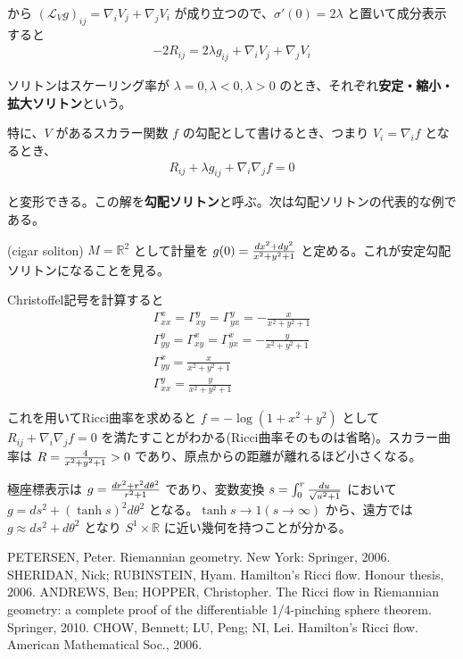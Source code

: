 \documentclass[dvipdfmx,a4paper]{jsreport}
\theoremstyle{definition}
\renewcommand{\L}{\mathcal{L}}
\newcommand{\R}{\mathbb{R}}
\begin{document}
から $(\L_V g)_{ij}=\nabla_i V_j+\nabla_j V_i$ が成り立つので、$\sigma'(0)=2\lambda$ と置いて成分表示すると
\begin{align*}
    -2R_{ij}=2\lambda g_{ij}+\nabla_i V_j+\nabla_j V_i
\end{align*}

ソリトンはスケーリング率が $\lambda=0,\lambda<0,\lambda>0$ のとき、それぞれ\textbf{安定・縮小・拡大ソリトン}という。

特に、$V$ があるスカラー関数 $f$ の勾配として書けるとき、つまり $V_i=\nabla_i f$ となるとき、
\begin{align*}
    R_{ij}+\lambda g_{ij}+\nabla_i \nabla_j f=0
\end{align*}

と変形できる。この解を\textbf{勾配ソリトン}と呼ぶ。次は勾配ソリトンの代表的な例である。

\eg (cigar soliton) $M=\R^2$ として計量を $g(0)={dx^2+dy^2 \over x^2+y^2+1}$ と定める。これが安定勾配ソリトンになることを見る。

Christoffel記号を計算すると
\begin{align*}
    \Gamma^x_{xx} = \Gamma^y_{xy} = \Gamma^y_{{yx}} = - \frac{x}{ x^2 + y^2+1} \\
    \Gamma^y_{yy} = \Gamma^x_{xy} = \Gamma^x_{{yx}} = - \frac{y}{x^2 + y^2+1} \\
    \Gamma^x_{yy} = \frac{x}{x^2 + y^2+1} \\
    \Gamma^y_{xx} = \frac{y}{x^2 + y^2+1}
\end{align*}

これを用いてRicci曲率を求めると $f=-\log(1+x^2+y^2)$ として $R_{ij}+\nabla_i \nabla_j f=0$ を満たすことがわかる(Ricci曲率そのものは省略)。スカラー曲率は $R={4 \over x^2+y^2+1}>0$ であり、原点からの距離が離れるほど小さくなる。

極座標表示は $g={dr^2+r^2d\theta^2 \over r^2+1}$ であり、変数変換 $s=\int_{0}^r {du \over \sqrt{u^2+1}}$ において $g=ds^2+(\tanh s)^2 d\theta^2$ となる。$\tanh s\to 1(s \to \infty)$ から、遠方では $g \approx ds^2+d\theta^2$ となり $S^1 \times \R$ に近い幾何を持つことが分かる。








\begin{thebibliography}{9}
     PETERSEN, Peter. Riemannian geometry. New York: Springer, 2006.
     SHERIDAN, Nick; RUBINSTEIN, Hyam. Hamilton's Ricci flow. Honour thesis, 2006.
     ANDREWS, Ben; HOPPER, Christopher. The Ricci flow in Riemannian geometry: a complete proof of the differentiable 1/4-pinching sphere theorem. Springer, 2010.
     CHOW, Bennett; LU, Peng; NI, Lei. Hamilton's Ricci flow. American Mathematical Soc., 2006.
\end{thebibliography}
\end{document}
